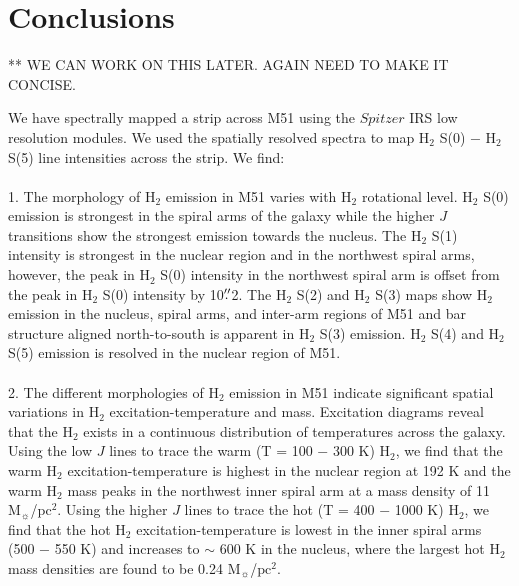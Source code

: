 \documentclass[manuscript]{aastex}
\begin{document}
\section{Conclusions}

** WE CAN WORK ON THIS LATER.  AGAIN NEED TO MAKE IT CONCISE.

We have spectrally mapped a strip across M51 using the $Spitzer$ IRS
low resolution modules.  We used the spatially resolved spectra to map
$\mathrm{H_2}$ S(0) $-$ $\mathrm{H_2}$ S(5) line intensities across
the strip.  We find:\\ \\ 1.  The morphology of $\mathrm{H_2}$
emission in M51 varies with $\mathrm{H_2}$ rotational level.
$\mathrm{H_2}$ S(0) emission is strongest in the spiral arms of the
galaxy while the higher $J$ transitions show the strongest emission
towards the nucleus.  The $\mathrm{H_2}$ S(1) intensity is strongest
in the nuclear region and in the northwest spiral arms, however, the
peak in $\mathrm{H_2}$ S(0) intensity in the northwest spiral arm is
offset from the peak in $\mathrm{H_2}$ S(0) intensity by 10$\mbox{$.\!\!^{\prime\prime}$}$2.
The $\mathrm{H_2}$ S(2) and $\mathrm{H_2}$ S(3) maps show
$\mathrm{H_2}$ emission in the nucleus, spiral arms, and inter-arm
regions of M51 and bar structure aligned north-to-south is apparent in
$\mathrm{H_2}$ S(3) emission.  $\mathrm{H_2}$ S(4) and $\mathrm{H_2}$
S(5) emission is resolved in the nuclear region of M51.\\
\\ 2.  The different morphologies of $\mathrm{H_2}$ emission in M51
indicate significant spatial variations in $\mathrm{H_2}$
excitation-temperature and mass.  Excitation diagrams reveal that the
$\mathrm{H_2}$ exists in a continuous distribution of temperatures
across the galaxy.  Using the low $J$ lines to trace the warm (T = 100
$-$ 300 K) $\mathrm{H_2}$, we find that the warm $\mathrm{H_2}$
excitation-temperature is highest in the nuclear region at 192 K and
the warm $\mathrm{H_2}$ mass peaks in the northwest inner spiral arm
at a mass density of 11 $\mathrm{M_\sun}$/$\mathrm{pc^2}$.  Using the
higher $J$ lines to trace the hot (T = 400 $-$ 1000 K) $\mathrm{H_2}$,
we find that the hot $\mathrm{H_2}$ excitation-temperature is lowest
in the inner spiral arms (500 $-$ 550 K) and increases to $\sim$ 600 K
in the nucleus, where the largest hot $\mathrm{H_2}$ mass densities
are found to be 0.24 $\mathrm{M_\sun}$/$\mathrm{pc^2}$.\\
\\ 
\end{document}
